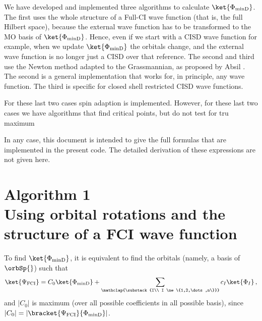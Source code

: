 \documentclass[a4paper,11pt]{article}
\begin{document}
We have developed and implemented three algorithms to calculate $\ket{\Phi_\text{minD}}$.
The first uses the whole structure of a Full-CI wave function (that is, the full Hilbert space), because the external wave function has to be transformed to the MO basis of $\ket{\Phi_\text{minD}}$.
Hence, even if we start with a CISD wave function for example, when we update $\ket{\Phi_\text{minD}}$ the orbitals change, and the external wave function is no longer just a CISD over that reference.
The second and third use the Newton method adapted to the Grassmannian, as proposed by Absil \etal{} \cite{}.
The second is a general implementation that works for, in principle, any wave function.
The third is specific for closed shell restricted CISD wave functions.

For these last two cases spin adaption is implemented.
However, for these last two cases we have algorithms that find critical points, but do not test for tru maximum

In any case, this document is intended to give the full formulas that are implemented in the present code.
The detailed derivation of these expressions are not given here.


\newpage
\section{\textsf{\LARGE Algorithm 1}\\Using orbital rotations and the structure of a FCI wave function}

To find $\ket{\Phi_\text{minD}}$, it is equivalent to find the orbitals (namely, a basis of $\orbSp{}$) such that 
\begin{equation}
  \ket{\Psi_\text{FCI}} = C_0 \ket{\Phi_\text{minD}} +
  \sum_{
    \mathclap{\substack{I\\
        I \ne \{1,2,\dots,n\}}}
      }
    c_I \ket{\Phi_I}\,,
\end{equation}
and $|C_0|$ is maximum (over all possible coefficients in all possible basis), since $|C_0| = |\bracket{\Psi_\text{FCI}}{\Phi_\text{minD}}|$.
\end{document}

